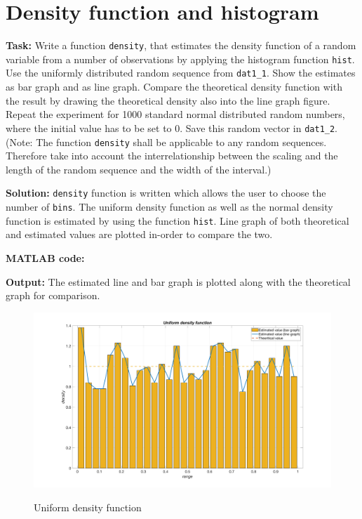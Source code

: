 \section{ Density function and histogram  } \label{ Density function and histogram }
\noindent \textbf{Task:} Write a function \texttt{density}, that estimates the density function of a random variable from a number of observations by applying the histogram function \texttt{hist}. Use the uniformly distributed random sequence from \texttt{dat1\_1}. Show the estimates as bar graph and as line graph. Compare the theoretical density function with the result by drawing the theoretical density also into the line graph figure. Repeat the experiment for 1000 standard normal distributed random numbers, where the initial value has to be set to 0. Save this random vector in \texttt{dat1\_2}.
(Note: The function \texttt{density} shall be applicable to any random sequences. Therefore take
into account the interrelationship between the scaling and the length of the random sequence and
the width of the interval.) 

\noindent \textbf{Solution:}
\noindent \texttt{density} function is written which allows the user to choose the number of \texttt{bins}. The uniform density function as well as the normal density function is estimated by using the function \texttt{hist}. Line graph of both theoretical and estimated values are plotted in-order to compare the two. 

\noindent \textbf{MATLAB code:}


\noindent \textbf{Output:}
\noindent The estimated line and bar graph is plotted along with the theoretical graph for comparison. 
\begin{figure}[H]
\centering
{\includegraphics[scale=0.12]{ass2_1.png}}
\caption{Uniform density function}
\label{Uniform density function}
\end{figure}

